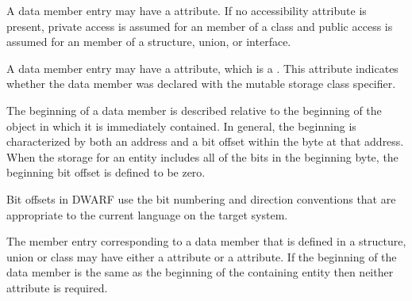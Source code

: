 A data member entry may have a \DWATaccessibility{}
attribute. 
If no accessibility attribute is present, private
access is assumed for an member of a class and public access
is assumed for an member of a structure, union, or interface.

A data member 
\hypertarget{chap:DWATmutablemutablepropertyofmemberdata}{}
entry 
may 
have a \DWATmutableDEFN{} attribute,
which is a . 
This attribute indicates whether the data
member was declared with the mutable storage class specifier.

The beginning of a data member 
is described relative to
the beginning of the object in which it is immediately
contained. In general, the beginning is characterized by
both an address and a bit offset within the byte at that
address. When the storage for an entity includes all of
the bits in the beginning byte, the beginning bit offset is
defined to be zero.

Bit offsets in DWARF use the bit numbering and direction
conventions that are appropriate to the current language on
the target system.

The member entry 
corresponding to a data member that is defined
\hypertarget{chap:DWATdatabitoffsetdatamemberbitlocation}{}
\hypertarget{chap:DWATdatamemberlocationdatamemberlocation}{}
in a structure, union or class may have either a 
\DWATdatamemberlocationDEFN{} attribute
or a \DWATdatabitoffsetDEFN{} attribute. 
If the beginning of the data member is the same as
the beginning of the containing entity then neither attribute
is required.

